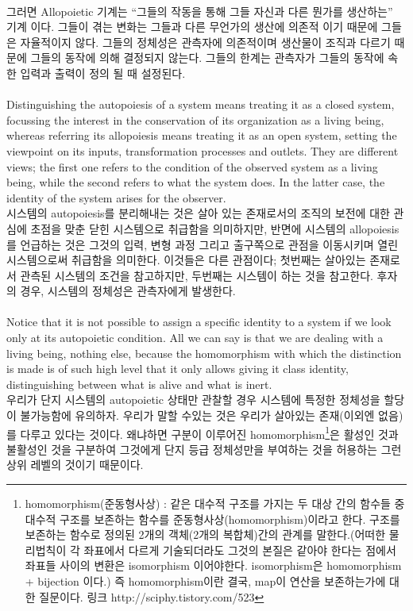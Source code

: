 \documentclass[11pt]{article} %
\begin{document}
\\
그러면 Allopoietic 기계는 ``그들의 작동을 통해 그들 자신과 다른 뭔가를 생산하는'' 기계 이다\citep[p.71]{maturana1994maquinas}. 그들이 겪는 변화는 그들과 다른 무언가의 생산에 의존적 이기 때문에 그들은 자율적이지 않다. 그들의 정체성은 관측자에 의존적이며 생산물이 조직과 다르기 때문에 그들의 동작에 의해 결정되지 않는다. 그들의 한계는 관측자가 그들의 동작에 속한 입력과 출력이 정의 될 때 설정된다\citep{maturana1994maquinas}.
\\
\\
Distinguishing the autopoiesis of a system means treating it as a closed system, focussing the interest in the conservation of its organization as a living being, whereas referring its allopoiesis means treating it as an open system, setting the viewpoint on its inputs, transformation processes and outlets. They are different views; the first one refers to the condition of the observed system as a living being, while the second refers to what the system does. In the latter case, the identity of the system arises for the observer.
\\
시스템의 autopoiesis를 분리해내는 것은 살아 있는 존재로서의 조직의 보전에 대한 관심에 초점을 맞춘 닫힌 시스템으로 취급함을 의미하지만, 반면에 시스템의 allopoiesis를 언급하는 것은 그것의 입력, 변형 과정 그리고 출구쪽으로 관점을 이동시키며 열린 시스템으로써 취급함을 의미한다. 이것들은 다른 관점이다; 첫번째는 살아있는 존재로서 관측된 시스템의 조건을 참고하지만, 두번째는 시스템이 하는 것을 참고한다. 후자의 경우, 시스템의 정체성은 관측자에게 발생한다.
\\
\\
Notice that it is not possible to assign a specific identity to a system if we look only at its autopoietic condition. All we can say is that we are dealing with a living being, nothing else, because the homomorphism with which the distinction is made is of such high level that it only allows giving it class identity, distinguishing between what is alive and what is inert.
\\
우리가 단지 시스템의 autopoietic 상태만 관찰할 경우 시스템에 특정한 정체성을 할당이 불가능함에 유의하자. 우리가 말할 수있는 것은 우리가 살아있는 존재(이외엔 없음)를 다루고 있다는 것이다. 왜냐하면 구분이 이루어진 homomorphism\footnote{homomorphism(준동형사상) : 같은 대수적 구조를 가지는 두 대상 간의 함수들 중 대수적 구조를 보존하는 함수를 준동형사상(homomorphism)이라고 한다. 구조를 보존하는 함수로 정의된 2개의 객체(2개의 복합체)간의 관계를 말한다.(어떠한 물리법칙이 각 좌표에서 다르게 기술되더라도 그것의 본질은 같아야 한다는 점에서 좌표들 사이의 변환은 isomorphism 이어야한다. isomorphism은 homomorphism + bijection 이다.) 즉 homomorphism이란 결국, map이 연산을 보존하는가에 대한 질문이다. 링크 http://sciphy.tistory.com/523}은 활성인 것과 불활성인 것을 구분하여 그것에게 단지 등급 정체성만을 부여하는 것을 허용하는 그런 상위 레벨의 것이기 때문이다.
\end{document}
